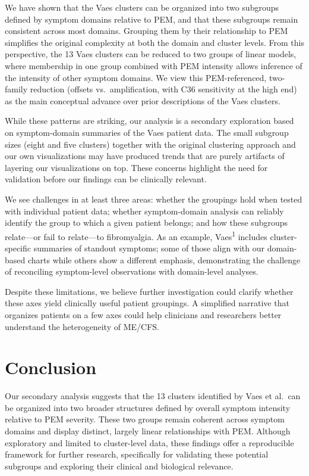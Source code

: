 \documentclass[
  letterpaper,
  DIV=11,
  numbers=noendperiod]{scrartcl}
\begin{document}
We have shown that the Vaes clusters can be organized into two subgroups
defined by symptom domains relative to PEM, and that these subgroups
remain consistent across most domains. Grouping them by their
relationship to PEM simplifies the original complexity at both the
domain and cluster levels. From this perspective, the 13 Vaes clusters
can be reduced to two groups of linear models, where membership in one
group combined with PEM intensity allows inference of the intensity of
other symptom domains. We view this PEM-referenced, two-family reduction
(offsets vs.~amplification, with C36 sensitivity at the high end) as the
main conceptual advance over prior descriptions of the Vaes clusters.

While these patterns are striking, our analysis is a secondary
exploration based on symptom-domain summaries of the Vaes patient data.
The small subgroup sizes (eight and five clusters) together with the
original clustering approach and our own visualizations may have
produced trends that are purely artifacts of layering our visualizations
on top. These concerns highlight the need for validation before our
findings can be clinically relevant.

We see challenges in at least three areas: whether the groupings hold
when tested with individual patient data; whether symptom-domain
analysis can reliably identify the group to which a given patient
belongs; and how these subgroups relate---or fail to relate---to
fibromyalgia. As an example, Vaes\textsuperscript{1} includes
cluster-specific summaries of standout symptoms; some of those align
with our domain-based charts while others show a different emphasis,
demonstrating the challenge of reconciling symptom-level observations
with domain-level analyses.

Despite these limitations, we believe further investigation could
clarify whether these axes yield clinically useful patient groupings. A
simplified narrative that organizes patients on a few axes could help
clinicians and researchers better understand the heterogeneity of
ME/CFS.

\section{Conclusion}\label{conclusion}

Our secondary analysis suggests that the 13 clusters identified by Vaes
et al.~can be organized into two broader structures defined by overall
symptom intensity relative to PEM severity. These two groups remain
coherent across symptom domains and display distinct, largely linear
relationships with PEM. Although exploratory and limited to
cluster-level data, these findings offer a reproducible framework for
further research, specifically for validating these potential subgroups
and exploring their clinical and biological relevance.
\end{document}
